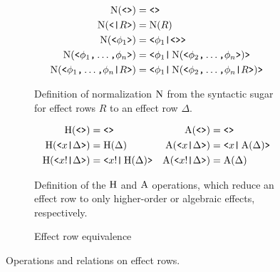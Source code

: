 \begin{figure}[htbp]
\begin{subfigure}{\textwidth}
    \begin{align*}
        \Norm(\tok{<>}) &= \tok{<>} \\
        \Norm(\tok{<}\tok{|} R \tok{>}) &= \Norm(R) \\
        \Norm(\tok{<} \phi_1 \tok{>}) &= \tok{<} \phi_1 \tok{|} \tok{<>} \tok{>} \\
        \Norm(\tok{<}\phi_1\tok{,}\dots\tok{,}\phi_n\tok{>})
        &= \tok{<} \phi_1 \tok{|} \Norm(\tok{<} \phi_2\tok{,}\dots\tok{,}\phi_n \tok{>}) \tok{>}\\ 
        \Norm(\tok{<}\phi_1\tok{,}\dots\tok{,}\phi_n\tok{|} R \tok{>})
        &= \tok{<} \phi_1 \tok{|}\Norm(\tok{<} \phi_2\tok{,}\dots\tok{,}\phi_n \tok{|} R \tok{>}) \tok{>}
    \end{align*}
    \caption{Definition of normalization $\Norm$ from the syntactic sugar for effect rows $R$ to an effect row $\Delta$.}
    \label{fig:normalization}
\end{subfigure}
\begin{subfigure}{\textwidth}
    \begin{align*}
        \Ho(\tok{<>}) &= \tok{<>} & \A(\tok{<>}) &= \tok{<>} \\
        \Ho(\tok{<} x \tok{|} \Delta \tok{>}) &= \Ho(\Delta) &
        \A(\tok{<} x \tok{|} \Delta \tok{>}) &= \tok{<} x \tok{|} \A(\Delta) \tok{>} \\
        \Ho(\tok{<} x! \tok{|} \Delta \tok{>}) &= \tok{<} x! \tok{|} \Ho(\Delta) \tok{>} &
        \A(\tok{<} x! \tok{|} \Delta \tok{>}) &= \A(\Delta)
    \end{align*}
    \caption{Definition of the $\Ho$ and $\A$ operations, which reduce an effect row to only higher-order or algebraic effects, respectively.}
    \label{fig:HandA}
\end{subfigure}
\begin{subfigure}{\textwidth}
    \caption{Effect row equivalence}
    \label{fig:rowequiv}
\end{subfigure}
\caption{Operations and relations on effect rows.}
\end{figure}

